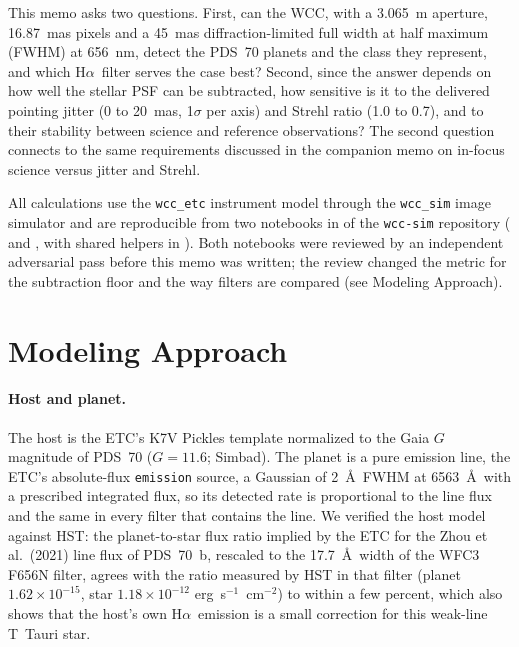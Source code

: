 \documentclass[11pt]{article}
\newcommand{\Ha}{H$\alpha$}
\newcommand{\ergcgs}{erg~s$^{-1}$~cm$^{-2}$}
\begin{document}
This memo asks two questions. First, can the WCC, with a 3.065~m aperture, 16.87~mas pixels and a 45~mas diffraction-limited full width at half maximum (FWHM) at 656~nm, detect the PDS~70 planets and the class they represent, and which \Ha\ filter serves the case best? Second, since the answer depends on how well the stellar PSF can be subtracted, how sensitive is it to the delivered pointing jitter (0 to 20~mas, 1$\sigma$ per axis) and Strehl ratio (1.0 to 0.7), and to their stability between science and reference observations? The second question connects to the same requirements discussed in the companion memo on in-focus science versus jitter and Strehl.

All calculations use the \texttt{wcc\_etc} instrument model through the \texttt{wcc\_sim} image simulator and are reproducible from two notebooks in  of the \texttt{wcc-sim} repository ( and , with shared helpers in ). Both notebooks were reviewed by an independent adversarial pass before this memo was written; the review changed the metric for the subtraction floor and the way filters are compared (see Modeling Approach).

\section*{Modeling Approach}

\paragraph{Host and planet.} The host is the ETC's K7V Pickles template normalized to the Gaia $G$ magnitude of PDS~70 ($G = 11.6$; Simbad). The planet is a pure emission line, the ETC's absolute-flux \texttt{emission} source, a Gaussian of 2~\AA\ FWHM at 6563~\AA\ with a prescribed integrated flux, so its detected rate is proportional to the line flux and the same in every filter that contains the line. We verified the host model against HST: the planet-to-star flux ratio implied by the ETC for the Zhou et al.\ (2021) line flux of PDS~70~b, rescaled to the 17.7~\AA\ width of the WFC3 F656N filter, agrees with the ratio measured by HST in that filter (planet $1.62 \times 10^{-15}$, star $1.18 \times 10^{-12}$ \ergcgs) to within a few percent, which also shows that the host's own \Ha\ emission is a small correction for this weak-line T~Tauri star.
\end{document}
